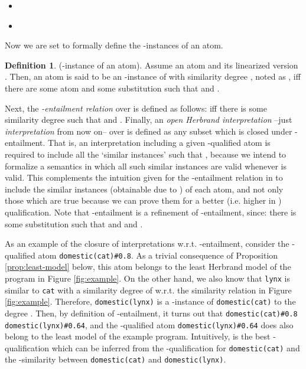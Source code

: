 \documentclass{sigplanconf}
\theoremstyle{definition}
\newtheorem{definition}{Definition}
\theoremstyle{plain}
\begin{document}
    \begin{itemize}
        \item  \\
        

        \item  \\
        
    \end{itemize}

Now we are set to formally define the -instances of an atom.

\begin{definition}\label{def:r-instance-atom}
(-instance of an atom). Assume an atom  and its linearized version . Then, an atom  is said to be an -instance of  with similarity degree , noted as , iff there are some atom  and some substitution  such that  and .
\end{definition}

Next, the \emph{-entailment relation} over  is defined as follows:  iff there is some similarity degree  such that  and . Finally, an \emph{open Herbrand interpretation} --just \emph{interpretation} from now on-- over  is defined as any subset  which is closed under -entailment. That is, an interpretation  including a given -qualified atom  is required to include all the `similar instances'  such that , because we intend to formalize a semantics in which all such similar instances are valid whenever  is valid. This complements the intuition given for the -entailment relation in  to include the similar instances (obtainable due to ) of each atom, and not only those which are true because we can prove them for a better (i.e. higher in ) qualification. Note that -entailment is a refinement of -entailment, since:   there is some substitution  such that  and    and   .

As an example of the closure of interpretations w.r.t. -entailment, consider the -qualified atom \texttt{domestic(cat)\#0.8}. As a trivial consequence of Proposition \ref{prop:least-model} below,  this atom belongs to the least Herbrand model of the program in Figure \ref{fig:example}. On the other hand, we also know that  \texttt{lynx} is similar to  \texttt{cat} with a similarity degree of  w.r.t. the similarity relation  in Figure \ref{fig:example}. Therefore, \texttt{domestic(lynx)} is a -instance of  \texttt{domestic(cat)} to the degree . Then, by definition of -entailment, it turns out that \texttt{domestic(cat)\#0.8}  \texttt{domestic(lynx)\#0.64}, and the -qualified atom \texttt{domestic(lynx)\#0.64} does also belong to the least model of the example program. Intuitively,  is the best -qualification which can be inferred from the -qualification  for  \texttt{domestic(cat)} and the -similarity  between  \texttt{domestic(cat)} and  \texttt{domestic(lynx)}.
\end{document}
